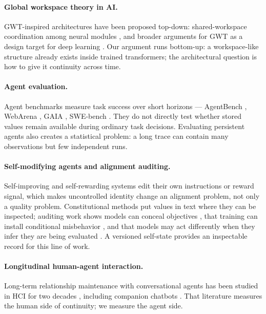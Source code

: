 \documentclass[11pt]{article}
\begin{document}
\paragraph{Global workspace theory in AI.} GWT-inspired architectures have been proposed top-down: shared-workspace coordination among neural modules \citep{goyal2022}, and broader arguments for GWT as a design target for deep learning \citep{vanrullen2021gwt}. Our argument runs bottom-up: a workspace-like structure already exists inside trained transformers; the architectural question is how to give it continuity across time.

\paragraph{Agent evaluation.} Agent benchmarks measure task success over short horizons --- AgentBench \citep{liu2024agentbench}, WebArena \citep{zhou2024webarena}, GAIA \citep{mialon2024gaia}, SWE-bench \citep{jimenez2024swebench}. They do not directly test whether stored values remain available during ordinary task decisions. Evaluating persistent agents also creates a statistical problem: a long trace can contain many observations but few independent runs.

\paragraph{Self-modifying agents and alignment auditing.} Self-improving and self-rewarding systems \citep{zelikman2024stop,yuan2024selfrewarding} edit their own instructions or reward signal, which makes uncontrolled identity change an alignment problem, not only a quality problem. Constitutional methods \citep{bai2022constitutional} put values in text where they can be inspected; auditing work shows models can conceal objectives \citep{marks2025auditing}, that training can install conditional misbehavior \citep{hubinger2024sleeper}, and that models may act differently when they infer they are being evaluated \citep{greenblatt2024alignmentfaking,perez2023mwe}. A versioned self-state provides an inspectable record for this line of work.

\paragraph{Longitudinal human-agent interaction.} Long-term relationship maintenance with conversational agents has been studied in HCI for two decades \citep{bickmore2005long}, including companion chatbots \citep{skjuve2021companion}. That literature measures the human side of continuity; we measure the agent side.
\end{document}
